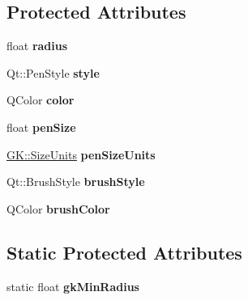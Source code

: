 \subsection*{Protected Attributes}
\begin{DoxyCompactItemize}
\item 
float {\bfseries radius}\hypertarget{classGKCircle_ab782440c46d59eb715925a1fbd301a54}{}\label{classGKCircle_ab782440c46d59eb715925a1fbd301a54}

\item 
Qt\+::\+Pen\+Style {\bfseries style}\hypertarget{classGKCircle_a0083e4393092c97cb6c51269facfe613}{}\label{classGKCircle_a0083e4393092c97cb6c51269facfe613}

\item 
Q\+Color {\bfseries color}\hypertarget{classGKCircle_a8e89582934dbf07b8076173bdc807c2d}{}\label{classGKCircle_a8e89582934dbf07b8076173bdc807c2d}

\item 
float {\bfseries pen\+Size}\hypertarget{classGKCircle_a0a20823dff855aa74ddf48034da8d591}{}\label{classGKCircle_a0a20823dff855aa74ddf48034da8d591}

\item 
\hyperlink{namespaceGK_adde45307f3be11d926c291a749271263}{G\+K\+::\+Size\+Units} {\bfseries pen\+Size\+Units}\hypertarget{classGKCircle_a0b924c29b8a5e34d53817d6dc2ab47d9}{}\label{classGKCircle_a0b924c29b8a5e34d53817d6dc2ab47d9}

\item 
Qt\+::\+Brush\+Style {\bfseries brush\+Style}\hypertarget{classGKCircle_a4d13bbbf5713247b9c2c0b32751218dc}{}\label{classGKCircle_a4d13bbbf5713247b9c2c0b32751218dc}

\item 
Q\+Color {\bfseries brush\+Color}\hypertarget{classGKCircle_a623689be849449444d67631791d04511}{}\label{classGKCircle_a623689be849449444d67631791d04511}

\end{DoxyCompactItemize}
\subsection*{Static Protected Attributes}
\begin{DoxyCompactItemize}
\item 
static float {\bfseries gk\+Min\+Radius}\hypertarget{classGKCircle_ada1d7ff00407e0cc2f4dcafe43613480}{}\label{classGKCircle_ada1d7ff00407e0cc2f4dcafe43613480}

\end{DoxyCompactItemize}
